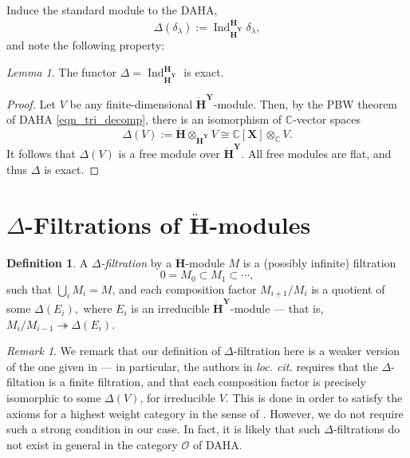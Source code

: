 \documentclass[a4paper]{report}
\theoremstyle{theorem}
\theoremstyle{definition}
\newtheorem{definition}{Definition}
\theoremstyle{remark}
\newtheorem{remark}{Remark}
\theoremstyle{proposition}
\theoremstyle{conjecture}
\theoremstyle{lemma}
\newtheorem{lemma}{Lemma}
\theoremstyle{corollary}
\theoremstyle{exercise}
\theoremstyle{example}
\newcommand{\C}{\mathbb{C}}
\newcommand{\mcal}{\mathcal}
\newcommand{\on}{\operatorname}
\begin{document}
  Induce the standard module to the DAHA,
  $$\Delta(\delta_\lambda) := \on{Ind}_{\mathbf{\dot{H}}^{\mathbf{Y}}}^{\mathbf{\ddot{\mathbf{H}}}} \delta_\lambda,$$
  and note the following property:
  
  \begin{lemma}\label{lem_delta_exact}
      The functor 
      $\Delta = \on{Ind}_{\mathbf{\dot{H}}^{\mathbf{Y}}}^{\mathbf{\ddot{\mathbf{H}}}}$ 
      is exact.
  \end{lemma}
  
  \begin{proof}
      Let $V$ be any finite-dimensional $\mathbf{\dot{H}}^{\mathbf{Y}}$-module.
      Then, by the PBW theorem of DAHA \eqref{eqn_tri_decomp}, there is an isomorphism of $\C$-vector
      spaces $$\Delta(V) := \mathbf{\ddot{\mathbf{H}}} \otimes_{\mathbf{\dot{H}}^{\mathbf{Y}}} V \cong \C[\mathbf{X}] \otimes_\C V.$$
      It follows that $\Delta(V)$ is a free module over 
      $\mathbf{\dot{H}}^{\mathbf{Y}}$. All free modules are flat, and thus 
      $\Delta$ is exact. 
  \end{proof}
  
  \section{$\Delta$-Filtrations of $\mathbf{\ddot{\mathbf{H}}}$-modules}
  
  \begin{definition}
      A \emph{$\Delta$-filtration} by a $\mathbf{\ddot{\mathbf{H}}}$-module $M$ 
      is a (possibly infinite) filtration
      $$0 = M_0 \subset M_1 \subset \cdots,$$
      such that $\bigcup_i M_i = M$, and
      each composition factor $M_{i+1}/M_i$
      is a quotient of some $\Delta(E_i),$ where $E_i$ is an irreducible
      $\mathbf{\dot{H}}^{\mathbf{Y}}$-module --- that is, 
      $M_i/M_{i-1} \twoheadrightarrow \Delta(E_i)$.
  \end{definition}
  
  \begin{remark}
      We remark that our definition of $\Delta$-filtration here is a weaker version
      of the one given in \cite[\S 2.3.3]{ggor03} --- in particular, the authors in \emph{loc. cit.}
      requires that the $\Delta$-filtation is a finite filtration, and that each 
      composition factor is precisely isomorphic to some $\Delta(V)$, for
      irreducible $V$. This is done in
      order to satisfy the axioms for a highest weight category in the sense of 
      \cite{cps88}.
      However, we do not require such a strong condition in our case. 
      In fact, it is likely that such $\Delta$-filtrations do not 
      exist in general in the category $\mcal{O}$ of DAHA.
  \end{remark}
  
\end{document}
